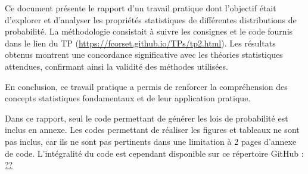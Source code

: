 Ce document présente le rapport d'un travail pratique dont l'objectif était d'explorer et d'analyser les propriétés statistiques de différentes distributions de probabilité. 
La méthodologie consistait à suivre les consignes et le code fournis dans le lien du TP (\href{https://fcorset.github.io/TPs/tp2.html}{https://fcorset.github.io/TPs/tp2.html}).
Les résultats obtenus montrent une concordance significative avec les théories statistiques attendues, confirmant ainsi la validité des méthodes utilisées. 

En conclusion, ce travail pratique a permis de renforcer la compréhension des concepts statistiques fondamentaux et de leur application pratique.

\vspace{2cm}
Dans ce rapport, seul le code permettant de générer les lois de probabilité est inclus en annexe.
Les codes permettant de réaliser les figures et tableaux ne sont pas inclus, car ils ne sont pas pertinents dans une limitation à 2 pages d'annexe de code.
L'intégralité du code est cependant disponible sur ce répertoire GitHub : \href{??}{??}
